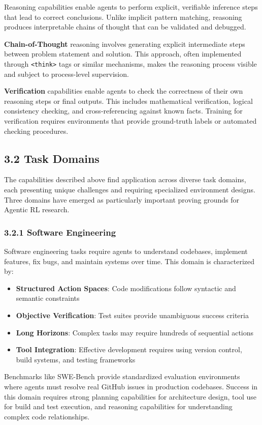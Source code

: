 Reasoning capabilities enable agents to perform explicit, verifiable inference steps that lead to correct conclusions. Unlike implicit pattern matching, reasoning produces interpretable chains of thought that can be validated and debugged.

\textbf{Chain-of-Thought} reasoning involves generating explicit intermediate steps between problem statement and solution. This approach, often implemented through \texttt{<think>} tags or similar mechanisms, makes the reasoning process visible and subject to process-level supervision.

\textbf{Verification} capabilities enable agents to check the correctness of their own reasoning steps or final outputs. This includes mathematical verification, logical consistency checking, and cross-referencing against known facts. Training for verification requires environments that provide ground-truth labels or automated checking procedures.

\subsection{3.2 Task Domains}

The capabilities described above find application across diverse task domains, each presenting unique challenges and requiring specialized environment designs. Three domains have emerged as particularly important proving grounds for Agentic RL research.

\subsubsection{3.2.1 Software Engineering}

Software engineering tasks require agents to understand codebases, implement features, fix bugs, and maintain systems over time. This domain is characterized by:

\begin{itemize}
    \item \textbf{Structured Action Spaces}: Code modifications follow syntactic and semantic constraints
    \item \textbf{Objective Verification}: Test suites provide unambiguous success criteria
    \item \textbf{Long Horizons}: Complex tasks may require hundreds of sequential actions
    \item \textbf{Tool Integration}: Effective development requires using version control, build systems, and testing frameworks

\end{itemize}
Benchmarks like SWE-Bench provide standardized evaluation environments where agents must resolve real GitHub issues in production codebases. Success in this domain requires strong planning capabilities for architecture design, tool use for build and test execution, and reasoning capabilities for understanding complex code relationships.


